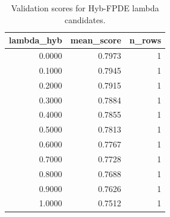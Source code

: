 \begin{table}[t]
\caption{Validation scores for Hyb-FPDE lambda candidates.}
\label{tab:lambda_distribution_computed}
\centering
\begin{tabular}{rrr}
\toprule
lambda\_hyb & mean\_score & n\_rows \\
\midrule
0.0000 & 0.7973 & 1 \\
0.1000 & 0.7945 & 1 \\
0.2000 & 0.7915 & 1 \\
0.3000 & 0.7884 & 1 \\
0.4000 & 0.7855 & 1 \\
0.5000 & 0.7813 & 1 \\
0.6000 & 0.7767 & 1 \\
0.7000 & 0.7728 & 1 \\
0.8000 & 0.7688 & 1 \\
0.9000 & 0.7626 & 1 \\
1.0000 & 0.7512 & 1 \\
\bottomrule
\end{tabular}

\end{table}
